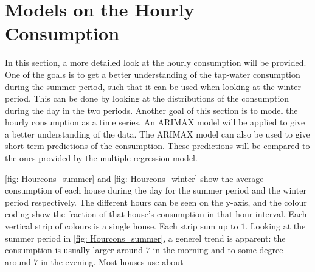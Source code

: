 \chapter{Models on the Hourly Consumption}
In this section, a more detailed look at the hourly consumption will be provided. One of the goals is to get a better understanding of the tap-water consumption during the summer period, such that it can be used when looking at the winter period. This can be done by looking at the distributions of the consumption during the day in the two periods. Another goal of this section is to model the hourly consumption as a time series. An ARIMAX model will be applied to give a better understanding of the data. The ARIMAX model can also be used to give short term predictions of the consumption. These predictions will be compared to the ones provided by the multiple regression model.

\noindent \cref{fig: Hourcons_summer} and \cref{fig: Hourcons_winter} show the average consumption of each house during the day for the summer period and the winter period respectively. The different hours can be seen on the y-axis, and the colour coding show the fraction of that house's consumption in that hour interval. Each vertical strip of colours is a single house. Each strip sum up to $1$. Looking at the summer period in \cref{fig: Hourcons_summer}, a generel trend is apparent: the consumption is usually larger around $7$ in the morning and to some degree around $7$ in the evening. Most houses use about 



